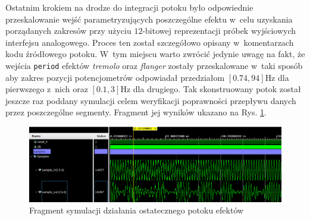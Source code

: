Ostatnim krokiem na drodze do integracji potoku było odpowiednie przeskalowanie wejść parametryzujących poszczególne efektu w~celu uzyskania porządanych zakresów przy użyciu $12$-bitowej reprezentacji próbek wyjściowych interfejsu analogowego. Proces ten został szczegółowo opisany w~komentarzach kodu źródłowego potoku. W~tym miejscu warto zwrócić jedynie uwagę na fakt, że wejścia \verb|period| efektów \textit{tremolo} oraz \textit{flanger} zostały przeskalowane w~taki sposób aby zakres pozycji potencjometrów odpowiadał przedziałom $[0.74,94]$Hz dla pierwszego z~nich oraz $[0.1,3]$Hz dla drugiego. Tak skonstruowany potok został jeszcze raz poddany symulacji celem weryfikacji poprawności przepływu danych przez poszczególne segmenty. Fragment jej wyników ukazano na Rys. \ref{sim-pipe}.

\vspace{0.5cm}
\begin{figure}[ht]
    \centering
    \includegraphics[width=\textwidth]{img/sim/pipe_sim.png}
    \captionsetup{format=plain,justification=centering}
    \caption{Fragment symulacji działania ostatecznego potoku efektów}
    \label{sim-pipe}
\end{figure}
\vspace{0.5cm}
